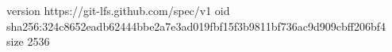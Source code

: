 version https://git-lfs.github.com/spec/v1
oid sha256:324c8652eadb62444bbe2a7e3ad019fbf15f3b9811bf736ac9d909cbff206bf4
size 2536
